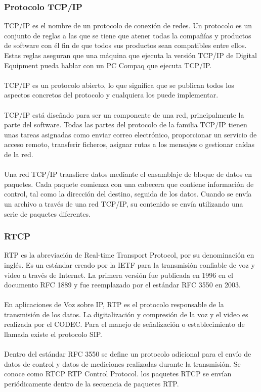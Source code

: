 \documentclass[12pt,letterpaper]{article}
\begin{document}
\subsubsection{Protocolo TCP/IP}
TCP/IP es el nombre de un protocolo de conexión de redes. Un protocolo es un conjunto de 
reglas a las que se tiene que atener todas la compañías y productos de software con él fin 
de que todos sus productos sean compatibles entre ellos. Estas reglas aseguran que una 
máquina que ejecuta la versión TCP/IP de Digital Equipment pueda hablar con un PC Compaq 
que ejecuta TCP/IP.
\\ \\
TCP/IP es un protocolo abierto, lo que significa que se publican todos los aspectos concretos 
del protocolo y cualquiera los puede implementar.
\\ \\
TCP/IP está diseñado para ser un componente de una red, principalmente la parte del software. 
Todas las partes del protocolo de la familia TCP/IP tienen unas tareas asignadas como enviar 
correo electrónico, proporcionar un servicio de acceso remoto, transferir ficheros, asignar 
rutas a los mensajes o gestionar caídas de la red.
\\ \\
Una red TCP/IP transfiere datos mediante el ensamblaje de bloque de datos en paquetes. Cada 
paquete comienza con una cabecera que contiene información de control, tal como la dirección 
del destino, seguida de los datos. Cuando se envía un archivo a través de una red TCP/IP, 
su contenido se envía utilizando una serie de paquetes diferentes. \cite{tcp}

\subsubsection{RTCP}
RTP es la abreviación de Real-time Transport Protocol, por su denominación en inglés. Es un 
estándar creado por la IETF para la transmisión confiable de voz y video a través de Internet. 
La primera versión fue publicada en 1996 en el documento RFC 1889 y fue reemplazado por el 
estándar RFC 3550 en 2003.
\\ \\
En aplicaciones de Voz sobre IP, RTP es el protocolo responsable de la transmisión de los 
datos. La digitalización y compresión de la voz y el video es realizada por el CODEC. Para 
el manejo de señalización o establecimiento de llamada existe el protocolo SIP.
\\ \\
Dentro del estándar RFC 3550 se define un protocolo adicional para el envío de datos de 
control y datos de mediciones realizadas durante la transmisión. Se conoce como RTCP RTP 
Control Protocol. los paquetes RTCP se envían periódicamente dentro de la secuencia de 
paquetes RTP. \cite{rtcp}
\end{document}
